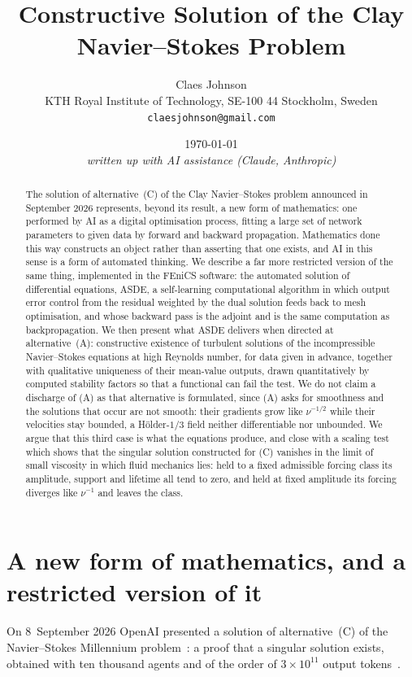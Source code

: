 \documentclass[11pt]{article}
\title{\vspace{-2em}Constructive Solution of the Clay Navier--Stokes Problem}
\author{Claes Johnson\\[0.2em]
\small KTH Royal Institute of Technology, SE-100 44 Stockholm, Sweden\\
\small \texttt{claesjohnson@gmail.com}}
\date{\today\\[0.4em]\small\textit{written up with AI assistance (Claude, Anthropic)}}
\begin{document}
\maketitle

\begin{abstract}
The solution of alternative~(C) of the Clay Navier--Stokes problem announced in September 2026
represents, beyond its result, a new form of mathematics: one performed by AI as a digital
optimisation process, fitting a large set of network parameters to given data by forward and
backward propagation. Mathematics done this way constructs an object rather than asserting that one
exists, and AI in this sense is a form of automated thinking. We describe a far more
restricted version of the same thing, implemented in the FEniCS software: the automated solution of
differential equations, ASDE, a self-learning computational
algorithm in which output error control from the residual weighted by the dual solution feeds back to
mesh optimisation, and whose backward pass is the adjoint and is the same computation as
backpropagation. We then present what
ASDE delivers when directed at alternative~(A): constructive existence of turbulent solutions of the
incompressible Navier--Stokes equations at high Reynolds number, for data given in advance, together
with qualitative uniqueness of their mean-value outputs, drawn quantitatively by computed stability
factors so that a functional can fail the test. We do not claim a discharge of (A) as that
alternative is formulated, since (A) asks for smoothness and the solutions that occur are not
smooth: their gradients grow like $\nu^{-1/2}$ while their velocities stay bounded, a
H\"older-$1/3$ field neither differentiable nor unbounded. We argue that this third case is what
the equations produce, and close with a scaling test which shows that the singular solution
constructed for (C) vanishes in the limit of small viscosity in which fluid mechanics lies: held to
a fixed admissible forcing class its amplitude, support and lifetime all tend to zero, and held at
fixed amplitude its forcing diverges like $\nu^{-1}$ and leaves the class.
\end{abstract}

\section{A new form of mathematics, and a restricted version of it}

On 8~September 2026 OpenAI presented a solution of alternative~(C) of the Navier--Stokes
Millennium problem~\cite{openai}: a proof that a singular solution exists, obtained with ten
thousand agents and of the order of $3\times10^{11}$ output tokens~\cite{buckmaster}.
\end{document}
